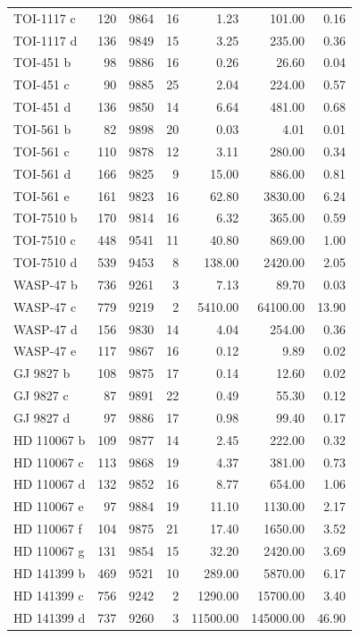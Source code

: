\begin{table}
\begin{tabular}{lrrrrrr}
TOI-1117 c & 120 & 9864 & 16 & 1.23 & 101.00 & 0.16 \\
TOI-1117 d & 136 & 9849 & 15 & 3.25 & 235.00 & 0.36 \\
TOI-451 b & 98 & 9886 & 16 & 0.26 & 26.60 & 0.04 \\
TOI-451 c & 90 & 9885 & 25 & 2.04 & 224.00 & 0.57 \\
TOI-451 d & 136 & 9850 & 14 & 6.64 & 481.00 & 0.68 \\
TOI-561 b & 82 & 9898 & 20 & 0.03 & 4.01 & 0.01 \\
TOI-561 c & 110 & 9878 & 12 & 3.11 & 280.00 & 0.34 \\
TOI-561 d & 166 & 9825 & 9 & 15.00 & 886.00 & 0.81 \\
TOI-561 e & 161 & 9823 & 16 & 62.80 & 3830.00 & 6.24 \\
TOI-7510 b & 170 & 9814 & 16 & 6.32 & 365.00 & 0.59 \\
TOI-7510 c & 448 & 9541 & 11 & 40.80 & 869.00 & 1.00 \\
TOI-7510 d & 539 & 9453 & 8 & 138.00 & 2420.00 & 2.05 \\
WASP-47 b & 736 & 9261 & 3 & 7.13 & 89.70 & 0.03 \\
WASP-47 c & 779 & 9219 & 2 & 5410.00 & 64100.00 & 13.90 \\
WASP-47 d & 156 & 9830 & 14 & 4.04 & 254.00 & 0.36 \\
WASP-47 e & 117 & 9867 & 16 & 0.12 & 9.89 & 0.02 \\
GJ 9827 b & 108 & 9875 & 17 & 0.14 & 12.60 & 0.02 \\
GJ 9827 c & 87 & 9891 & 22 & 0.49 & 55.30 & 0.12 \\
GJ 9827 d & 97 & 9886 & 17 & 0.98 & 99.40 & 0.17 \\
HD 110067 b & 109 & 9877 & 14 & 2.45 & 222.00 & 0.32 \\
HD 110067 c & 113 & 9868 & 19 & 4.37 & 381.00 & 0.73 \\
HD 110067 d & 132 & 9852 & 16 & 8.77 & 654.00 & 1.06 \\
HD 110067 e & 97 & 9884 & 19 & 11.10 & 1130.00 & 2.17 \\
HD 110067 f & 104 & 9875 & 21 & 17.40 & 1650.00 & 3.52 \\
HD 110067 g & 131 & 9854 & 15 & 32.20 & 2420.00 & 3.69 \\
HD 141399 b & 469 & 9521 & 10 & 289.00 & 5870.00 & 6.17 \\
HD 141399 c & 756 & 9242 & 2 & 1290.00 & 15700.00 & 3.40 \\
HD 141399 d & 737 & 9260 & 3 & 11500.00 & 145000.00 & 46.90 \\

\end{tabular}
\end{table}
